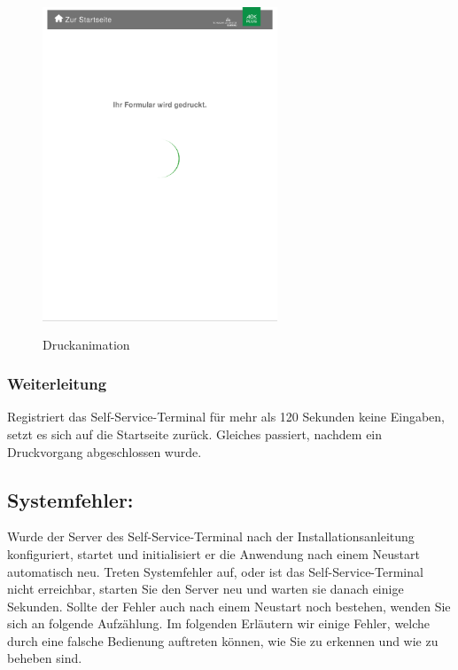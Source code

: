\begin{figure}[htp]
    \centering
    \includegraphics[width=7cm , height=10cm]{Bilder/Drucken.png}
    \caption[Startseite des Self-Service-Terminals]{Druckanimation}
    \label{fig:SSTDrucken}
\end{figure}

\subsubsection{Weiterleitung} Registriert das Self-Service-Terminal für mehr als 120 Sekunden keine Eingaben, setzt es sich auf die Startseite zurück. Gleiches passiert, nachdem ein Druckvorgang abgeschlossen wurde.

\newpage

\subsection{Systemfehler:}
Wurde der Server des Self-Service-Terminal nach der Installationsanleitung konfiguriert, startet und initialisiert er die Anwendung nach einem Neustart automatisch neu. Treten Systemfehler auf, oder ist das Self-Service-Terminal nicht erreichbar, starten Sie den Server neu und warten sie danach einige Sekunden. Sollte der Fehler auch nach einem Neustart noch bestehen, wenden Sie sich an folgende Aufzählung.
Im folgenden Erläutern wir einige Fehler, welche durch eine falsche Bedienung auftreten können, wie Sie zu erkennen und wie zu beheben sind.

